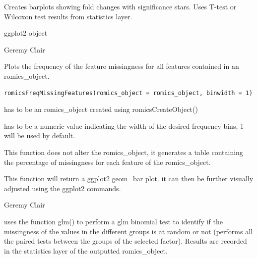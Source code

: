 \documentclass[a4paper]{book}
\begin{document}
%
\begin{Details}
Creates barplots showing fold changes with significance stars. Uses T-test or Wilcoxon test results from statistics layer.
\end{Details}
%
\begin{Value}
ggplot2 object
\end{Value}
%
\begin{Author}
Geremy Clair
\end{Author}
%
\begin{Description}
Plots the frequency of the feature missingness for all features contained in an romics\_object.
\end{Description}
%
\begin{Usage}
\begin{verbatim}
romicsFreqMissingFeatures(romics_object = romics_object, binwidth = 1)
\end{verbatim}
\end{Usage}
%
\begin{Arguments}
\begin{ldescription}
\item[\code{romics\_object}] has to be an romics\_object created using romicsCreateObject()

\item[\code{binwidth}] has to be a numeric value indicating the width of the desired frequency bins, 1 will be used by default.
\end{ldescription}
\end{Arguments}
%
\begin{Details}
This function does not alter the romics\_object, it generates a table containing the percentage of missingness for each feature of the romics\_object.
\end{Details}
%
\begin{Value}
This function will return a ggplot2 geom\_bar plot. it can then be further visually adjusted using the ggplot2 commands.
\end{Value}
%
\begin{Author}
Geremy Clair
\end{Author}
%
\begin{Description}
uses the function glm() to perform a glm binomial test to identify if the missingness of the values in the different groups is at random or not (performs all the paired tests between the groups of the selected factor). Results are recorded in the statistics layer of the outputted romics\_object.
\end{Description}
\end{document}
